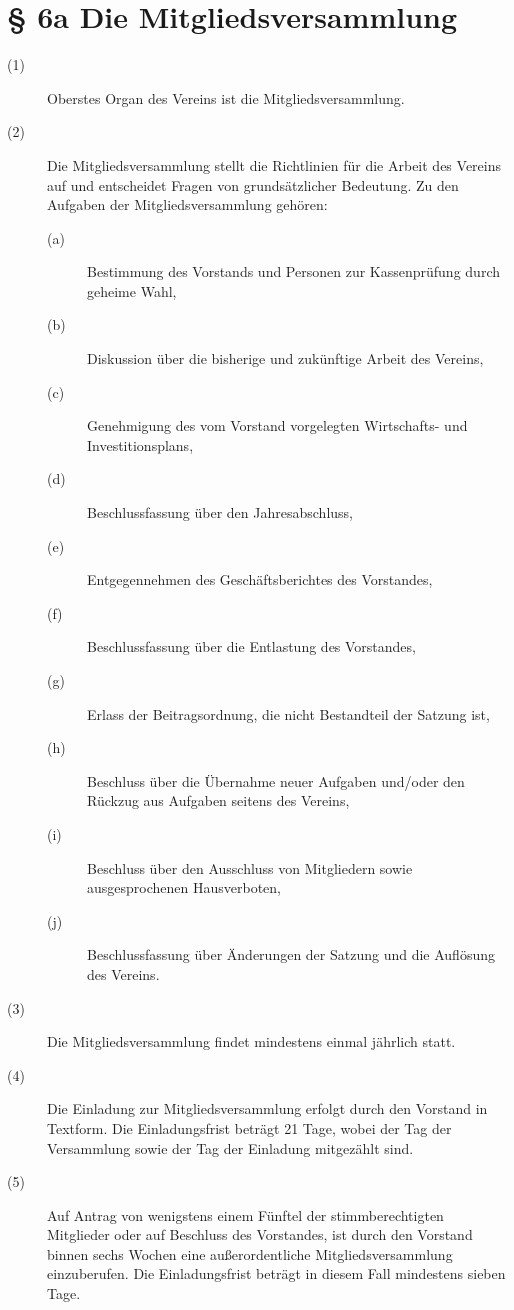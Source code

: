 \documentclass[a4paper,12pt]{scrartcl}
\begin{document}
\section*{\S{} 6a Die Mitgliedsversammlung}
\begin{description} 

\item[(1)] Oberstes Organ des Vereins ist die Mitgliedsversammlung.
\item[(2)] Die Mitgliedsversammlung stellt die Richtlinien für die Arbeit des Vereins auf und entscheidet Fragen von grundsätzlicher Bedeutung. Zu den Aufgaben der Mitgliedsversammlung gehören:
\begin{description} 
\item[(a)] Bestimmung des Vorstands und Personen zur Kassenprüfung durch geheime Wahl,
\item[(b)] Diskussion über die bisherige und zukünftige Arbeit des Vereins,
\item[(c)] Genehmigung des vom Vorstand vorgelegten Wirtschafts- und Investitionsplans,
\item[(d)] Beschlussfassung über den Jahresabschluss,
\item[(e)] Entgegennehmen des Geschäftsberichtes des Vorstandes,
\item[(f)] Beschlussfassung über die Entlastung des Vorstandes,
\item[(g)] Erlass der Beitragsordnung, die nicht Bestandteil der Satzung ist,
\item[(h)] Beschluss über die Übernahme neuer Aufgaben und/oder den Rückzug aus Aufgaben seitens des Vereins,
\item[(i)] Beschluss über den Ausschluss von Mitgliedern sowie ausgesprochenen Hausverboten,
\item[(j)] Beschlussfassung über Änderungen der Satzung und die Auflösung des Vereins.
\end{description}
\item[(3)] Die Mitgliedsversammlung findet mindestens einmal jährlich statt.
\item[(4)] Die Einladung zur Mitgliedsversammlung erfolgt durch den Vorstand in Textform. Die Einladungsfrist beträgt 21 Tage, wobei der Tag der Versammlung sowie der Tag der Einladung mitgezählt sind.
\item[(5)] Auf Antrag von wenigstens einem Fünftel der stimmberechtigten Mitglieder oder auf Beschluss des Vorstandes, ist durch den Vorstand binnen sechs Wochen eine außerordentliche Mitgliedsversammlung einzuberufen. Die Einladungsfrist beträgt in diesem Fall mindestens sieben Tage.

\end{description}
\end{document}
